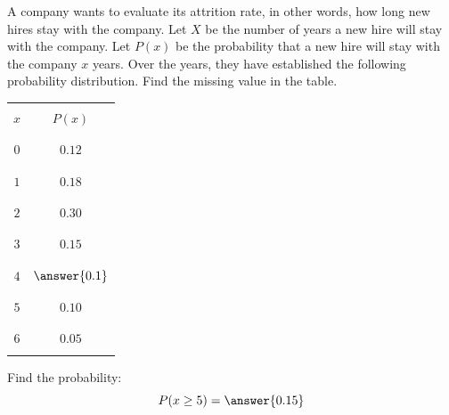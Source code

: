 \documentclass{ximera}
\begin{document}
\begin{problem}\label{prob:exam2prob4}
A company wants to evaluate its attrition rate, in other words, how long new hires stay with the company. Let $X$ be the number of years a new hire will stay with the company.
Let $P(x)$ be the probability that a new hire will stay with the company $x$ years.  Over the years, they have established the following probability
distribution.  Find the missing value in the table.
\begin{center}
\begin{tabular}{|c|c|}
 \hline
 & \\
 $x$&$P(x)$\\
 & \\
 \hline
  & \\
 $0$&$0.12$\\
 & \\
 \hline
 & \\
 $1$&$0.18$\\
 & \\
 \hline
  & \\
 $2$&$0.30$\\
 & \\
 \hline
  & \\
 $3$&$0.15$\\
 & \\
 \hline
  & \\
 $4$&$\answer{0.1}$\\
 & \\
 \hline
  & \\
 $5$&$0.10$\\
 & \\
 \hline
  & \\
 $6$&$0.05$\\
 & \\
 \hline
\end{tabular}
\end{center}
Find the probability:
$$P(x\geq 5)=\answer{0.15}$$

\end{problem}
\end{document}
